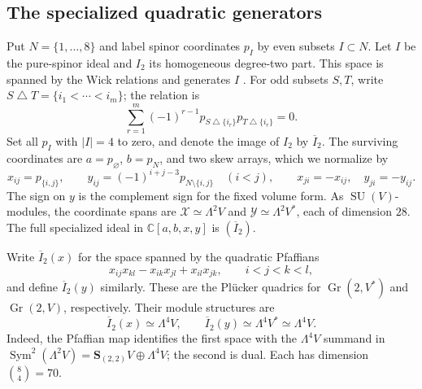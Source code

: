 \documentclass[11pt]{article}
\newcommand{\C}{\mathbb C}
\newcommand{\Gr}{\operatorname{Gr}}
\newcommand{\Sym}{\operatorname{Sym}}
\newcommand{\SU}{\operatorname{SU}}
\newcommand{\bS}{\mathbf S}
\theoremstyle{definition}
\numberwithin{equation}{section}
\begin{document}
\subsection{The specialized quadratic generators}
Put $N=\{1,\ldots,8\}$ and label spinor coordinates $p_I$ by even
subsets $I\subset N$. Let $I$ be the pure-spinor ideal and $I_2$
its homogeneous degree-two part. This space is spanned by the Wick
relations and generates $I$ \cite[Section~2]{Rincon}.
For odd subsets $S,T$, write
$S\mathbin\triangle T=\{i_1<\cdots<i_m\}$; the relation is
\begin{equation}\label{eq:wick}
 \sum_{r=1}^m(-1)^{r-1}
 p_{S\mathbin\triangle\{i_r\}}
 p_{T\mathbin\triangle\{i_r\}}=0.
\end{equation}
Set all $p_I$ with $|I|=4$ to zero, and denote the image of $I_2$
by $\overline I_2$. The surviving coordinates are $a=p_\varnothing$,
$b=p_N$, and two skew arrays, which we normalize by
\[
 x_{ij}=p_{\{i,j\}},\qquad
 y_{ij}=(-1)^{i+j-3}p_{N\setminus\{i,j\}}\quad(i<j),
 \qquad x_{ji}=-x_{ij},\quad y_{ji}=-y_{ij}.
\]
The sign on $y$ is the complement sign for the fixed volume form.
As $\SU(V)$-modules, the coordinate spans are
$\mathcal X\simeq\Lambda^2V$ and $\mathcal Y\simeq\Lambda^2V^*$,
each of dimension $28$. The full specialized ideal in
$\C[a,b,x,y]$ is $(\overline I_2)$.

Write $\overline I_2(x)$ for the space spanned by the quadratic
Pfaffians
\[
 x_{ij}x_{kl}-x_{ik}x_{jl}+x_{il}x_{jk},\qquad i<j<k<l,
\]
and define $\overline I_2(y)$ similarly. These are the Pl\"ucker
quadrics for $\Gr(2,V^*)$ and $\Gr(2,V)$, respectively.
Their module structures are
\[
 \overline I_2(x)\simeq\Lambda^4V,\qquad
 \overline I_2(y)\simeq\Lambda^4V^*\simeq\Lambda^4V.
\]
Indeed, the Pfaffian map identifies the first space with the
$\Lambda^4V$ summand in
$\Sym^2(\Lambda^2V)=\bS_{(2,2)}V\oplus\Lambda^4V$;
the second is dual. Each has dimension $\binom84=70$.
\end{document}

